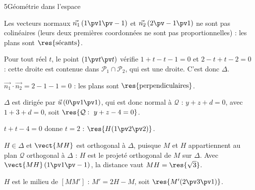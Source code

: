 \begin{corrigeBac}{5}{Géométrie dans l'espace}
\begin{questions}
  \item Les vecteurs normaux $\vec{n_1}\,(1\pv1\pv-1)$ et $\vec{n_2}\,(2\pv-1\pv1)$ ne sont pas colinéaires (leurs deux premières
    coordonnées ne sont pas proportionnelles) : les plans sont $\res{\text{sécants}}$. 
  \item Pour tout réel $t$, le point $(1\pv t\pv t)$ vérifie $1+t-t-1=0$ et $2-t+t-2=0$ : cette droite est contenue dans
    $\mathcal{P}_1\cap\mathcal{P}_2$, qui est une droite. C'est donc $\Delta$. \pts{1 pt}
  \item $\vec{n_1}\cdot\vec{n_2}=2-1-1=0$ : les plans sont $\res{\text{perpendiculaires}}$. 
  \item $\Delta$ est dirigée par $\vec u\,(0\pv1\pv1)$, qui est donc normal à $\mathcal{Q}$ : $y+z+d=0$, avec $1+3+d=0$, soit
    $\res{\mathcal{Q}:\ y+z-4=0}$. 
  \item $t+t-4=0$ donne $t=2$ : $\res{H(1\pv2\pv2)}$. 
  \item $H\in\Delta$ et $\vect{MH}$ est orthogonal à $\Delta$, puisque $M$ et $H$ appartiennent au plan $\mathcal{Q}$ orthogonal à $\Delta$ :
    $H$ est le projeté orthogonal de $M$ sur $\Delta$. Avec $\vect{MH}\,(1\pv1\pv-1)$, la distance vaut $MH=\res{\sqrt3}$. 
  \item $H$ est le milieu de $[MM']$ : $M'=2H-M$, soit $\res{M'(2\pv3\pv1)}$. 
\end{questions}
\end{corrigeBac}

